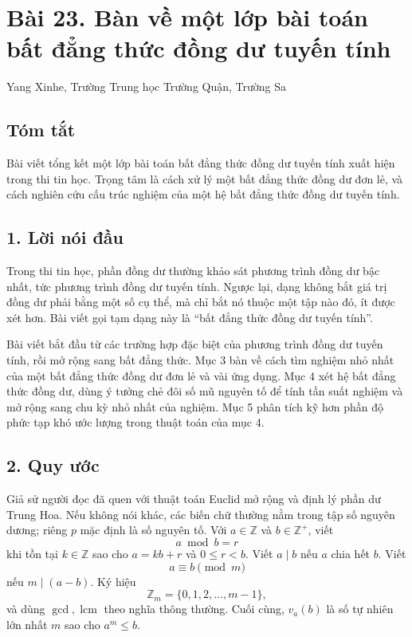 \documentclass[11pt]{article}
\begin{document}
\section*{Bài 23. Bàn về một lớp bài toán bất đẳng thức đồng dư tuyến tính}

\begin{center}
Yang Xinhe, Trường Trung học Trường Quận, Trường Sa
\end{center}

\subsection*{Tóm tắt}

Bài viết tổng kết một lớp bài toán bất đẳng thức đồng dư tuyến tính xuất hiện
trong thi tin học. Trọng tâm là cách xử lý một bất đẳng thức đồng dư đơn lẻ,
và cách nghiên cứu cấu trúc nghiệm của một hệ bất đẳng thức đồng dư tuyến
tính.

\subsection*{1. Lời nói đầu}

Trong thi tin học, phần đồng dư thường khảo sát phương trình đồng dư bậc nhất,
tức phương trình đồng dư tuyến tính. Ngược lại, dạng không bắt giá trị đồng dư
phải bằng một số cụ thể, mà chỉ bắt nó thuộc một tập nào đó, ít được xét hơn.
Bài viết gọi tạm dạng này là ``bất đẳng thức đồng dư tuyến tính''.

Bài viết bắt đầu từ các trường hợp đặc biệt của phương trình đồng dư tuyến
tính, rồi mở rộng sang bất đẳng thức. Mục 3 bàn về cách tìm nghiệm nhỏ nhất
của một bất đẳng thức đồng dư đơn lẻ và vài ứng dụng. Mục 4 xét hệ bất đẳng
thức đồng dư, dùng ý tưởng chẻ đôi số mũ nguyên tố để tính tần suất nghiệm và
mở rộng sang chu kỳ nhỏ nhất của nghiệm. Mục 5 phân tích kỹ hơn phần độ phức
tạp khó ước lượng trong thuật toán của mục 4.

\subsection*{2. Quy ước}

Giả sử người đọc đã quen với thuật toán Euclid mở rộng và định lý phần dư
Trung Hoa. Nếu không nói khác, các biến chữ thường nằm trong tập số nguyên
dương; riêng \(p\) mặc định là số nguyên tố. Với \(a\in\mathbb Z\) và
\(b\in\mathbb Z^+\), viết
\[
  a\bmod b=r
\]
khi tồn tại \(k\in\mathbb Z\) sao cho \(a=kb+r\) và \(0\le r<b\). Viết
\(a\mid b\) nếu \(a\) chia hết \(b\). Viết
\[
  a\equiv b\pmod m
\]
nếu \(m\mid(a-b)\). Ký hiệu
\[
  \mathbb Z_m=\{0,1,2,\ldots,m-1\},
\]
và dùng \(\gcd,\operatorname{lcm}\) theo nghĩa thông thường. Cuối cùng,
\(v_a(b)\) là số tự nhiên lớn nhất \(m\) sao cho \(a^m\le b\).
\end{document}
